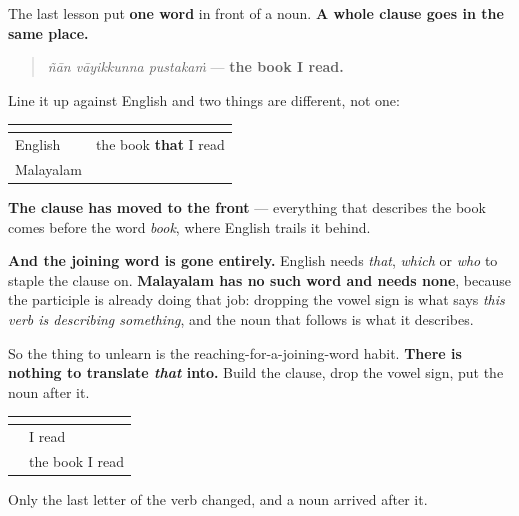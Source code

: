 \begin{grammarlens}[title={Grammar Lens: the clause goes in front, and nothing joins it}]
The last lesson put \textbf{one word} in front of a noun. \textbf{A whole clause goes in the same place.}

\begin{quote}
\textbf{  }
\end{quote}

\begin{quote}
\emph{ñān vāyikkunna pustakaṁ} — \textbf{the book I read.}
\end{quote}

Line it up against English and two things are different, not one:

\noindent
\begin{tabularx}{\linewidth}{@{}>{\raggedright\arraybackslash}X>{\raggedright\arraybackslash}X@{}}
\toprule
\textbf{} & \textbf{} \\
\midrule
English & the book \textbf{that} I read \\
Malayalam & \textbf{\ml{ഞാൻ} \ml{വായിക്കുന്ന}} \ml{പുസ്തകം} \\
\bottomrule
\end{tabularx}

\textbf{The clause has moved to the front} — everything that describes the book comes before the word \emph{book}, where English trails it behind.

\textbf{And the joining word is gone entirely.} English needs \emph{that}, \emph{which} or \emph{who} to staple the clause on. \textbf{Malayalam has no such word and needs none}, because the participle is already doing that job: dropping the vowel sign is what says \emph{this verb is describing something}, and the noun that follows is what it describes.

So the thing to unlearn is the reaching-for-a-joining-word habit. \textbf{There is nothing to translate \emph{that} into.} Build the clause, drop the vowel sign, put the noun after it.

\noindent
\begin{tabularx}{\linewidth}{@{}>{\raggedright\arraybackslash}X>{\raggedright\arraybackslash}X@{}}
\toprule
\textbf{} & \textbf{} \\
\midrule
\textbf{\ml{ഞാൻ} \ml{വായിക്കുന്നു}} & I read \\
\textbf{\ml{ഞാൻ} \ml{വായിക്കുന്ന} \ml{പുസ്തകം}} & the book I read \\
\bottomrule
\end{tabularx}

Only the last letter of the verb changed, and a noun arrived after it.
\end{grammarlens}


